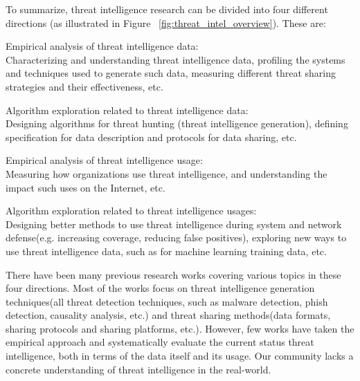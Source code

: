 To summarize, threat intelligence research can be divided into four 
different directions (as illustrated in Figure
~\ref{fig:threat_intel_overview}). These are:
\begin{prettylist}
    \item Empirical analysis of threat intelligence data: \\
    Characterizing and understanding threat intelligence data, profiling the 
    systems and techniques used to generate such data, measuring different 
    threat sharing strategies and their effectiveness, etc.
    
    \item Algorithm exploration related to threat intelligence data: \\
    Designing algorithms for threat hunting (threat intelligence generation),
    defining specification for data description and protocols for data 
    sharing, etc.
    
    \item Empirical analysis of threat intelligence usage: \\
    Measuring how organizations use threat intelligence, and understanding
    the impact such uses on the Internet, etc.
    
    \item Algorithm exploration related to threat intelligence usages: \\
    Designing better methods to use threat intelligence during system and 
    network defense(e.g. increasing coverage, reducing false positives),
    exploring new ways to use threat intelligence data, such as for machine
    learning training data, etc.
\end{prettylist}

There have been many previous research works covering various topics in these
four directions. Most of the works focus on threat intelligence generation
techniques(all threat detection techniques, such as malware detection, phish 
detection, causality analysis, etc.) and threat sharing methods(data formats, 
sharing protocols and sharing platforms, etc.). However, few works have taken
the empirical approach and systematically evaluate the current status threat
intelligence, both in terms of the data itself and its usage. Our community 
lacks a concrete understanding of threat intelligence in the real-world.

